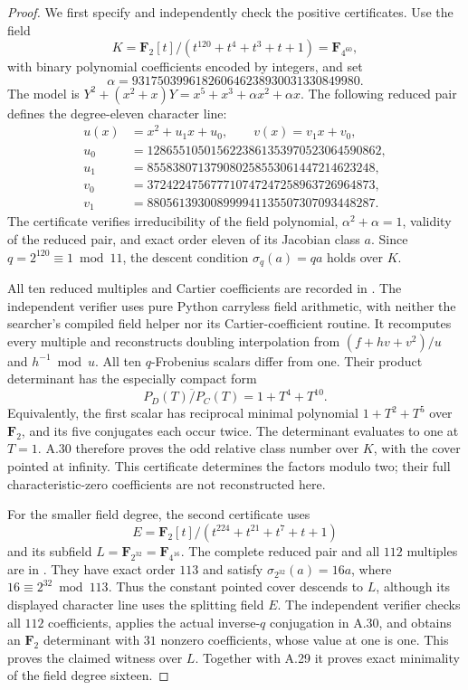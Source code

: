 \documentclass[11pt]{article}
\begin{document}
\begin{proof}
We first specify and independently check the positive certificates.
Use the field
\[
 K=\mathbf F_2[t]/(t^{120}+t^4+t^3+t+1)=\mathbf F_{4^{60}},
\]
with binary polynomial coefficients encoded by integers, and set
\[
 \alpha=931750399618260646238930031330849980.
\]
The model is $Y^2+(x^2+x)Y=x^5+x^3+\alpha x^2+\alpha x$.
The following reduced pair defines the degree-eleven character line:
\[
 \begin{aligned}
 u(x)&=x^2+u_1x+u_0,\qquad v(x)=v_1x+v_0,\\
 u_0&=1286551050156223861353970523064590862,\\
 u_1&=855838071379080258553061447214623248,\\
 v_0&=372422475677710747247258963726964873,\\
 v_1&=880561393008999941135507307093448287.
 \end{aligned}
\]
The certificate verifies irreducibility of the field polynomial,
$\alpha^2+\alpha=1$, validity of the reduced pair, and exact order
eleven of its Jacobian class $a$. Since $q=2^{120}\equiv1\bmod11$,
the descent condition $\sigma_q(a)=qa$ holds over $K$.

All ten reduced multiples and Cartier coefficients are recorded in
.
The independent verifier  uses
pure Python carryless field arithmetic, with neither the searcher's
compiled field helper nor its Cartier-coefficient routine.
It recomputes every multiple and reconstructs doubling interpolation
from $(f+hv+v^2)/u$ and $h^{-1}\bmod u$.
All ten $q$-Frobenius scalars differ from one. Their product
determinant has the especially compact form
\[
          \overline{P_D(T)/P_C(T)}=1+T^4+T^{10}.
\]
Equivalently, the first scalar has reciprocal minimal polynomial
$1+T^2+T^5$ over $\mathbf F_2$, and its five conjugates each occur
twice. The determinant evaluates to one at $T=1$.
A.30 therefore proves the odd relative class number over $K$,
with the cover pointed at infinity. This certificate determines
the factors modulo two; their full characteristic-zero coefficients
are not reconstructed here.

For the smaller field degree, the second certificate uses
\[
 E=\mathbf F_2[t]/(t^{224}+t^{21}+t^7+t+1)
\]
and its subfield $L=\mathbf F_{2^{32}}=\mathbf F_{4^{16}}$.
The complete reduced pair and all $112$ multiples are in
.
They have exact order $113$ and satisfy $\sigma_{2^{32}}(a)=16a$,
where $16\equiv2^{32}\bmod113$.
Thus the constant pointed cover descends to $L$, although its
displayed character line uses the splitting field $E$.
The independent verifier checks all $112$ coefficients, applies
the actual inverse-$q$ conjugation in A.30, and obtains an
$\mathbf F_2$ determinant with $31$ nonzero coefficients, whose
value at one is one. This proves the claimed witness over $L$.
Together with A.29 it proves exact minimality of the field degree
sixteen.


\end{proof}
\end{document}

